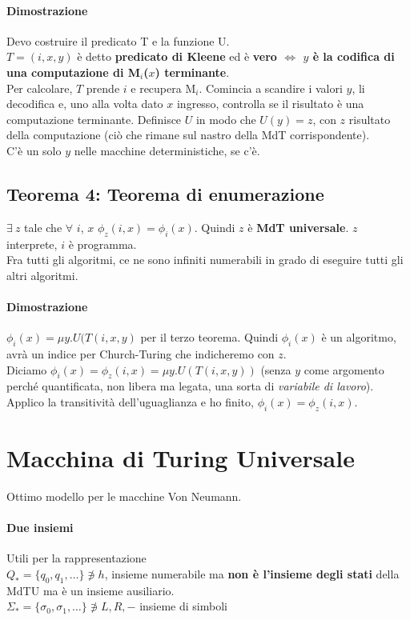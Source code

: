 \documentclass[10pt]{book}
\begin{document}
\paragraph{Dimostrazione} Devo costruire il predicato T e la funzione U.\\
$T = (i, x, y)$ è detto \textbf{predicato di Kleene} ed è \textbf{vero $\Leftrightarrow$ $y$ è la codifica di una computazione di M$_i$($x$) terminante}.\\
Per calcolare, $T$ prende $i$ e recupera M$_i$. Comincia a scandire i valori $y$, li decodifica e, uno alla volta dato $x$ ingresso, controlla se il risultato è una computazione terminante. Definisce $U$ in modo che $U(y) = z$, con $z$ risultato della computazione (ciò che rimane sul nastro della MdT corrispondente).\\
C'è un solo $y$ nelle macchine deterministiche, se c'è.
\subsection{Teorema 4: Teorema di enumerazione}
$\exists\: z$ tale che $\forall$ $i$, $x$ $\phi_z(i, x) = \phi_i(x)$. Quindi $z$ è \textbf{MdT universale}. $z$ interprete, $i$ è programma.\\
Fra tutti gli algoritmi, ce ne sono infiniti numerabili in grado di eseguire tutti gli altri algoritmi.
\paragraph{Dimostrazione} $\phi_i(x) = \mu y.U(T(i, x, y)$ per il terzo teorema. Quindi $\phi_i(x)$ è un algoritmo, avrà un indice per Church-Turing che indicheremo con $z$.\\
Diciamo $\phi_i(x) = \phi_z(i, x) = \mu y.U(T(i, x, y))$ (senza $y$ come argomento perché quantificata, non libera ma legata, una sorta di \textit{variabile di lavoro}). Applico la transitività dell'uguaglianza e ho finito, $\phi_i(x) = \phi_z(i, x)$.
\pagebreak
\section{Macchina di Turing Universale}
Ottimo modello per le macchine Von Neumann.
\paragraph{Due insiemi} Utili per la rappresentazione\\
$Q_* = \{q_0, q_1, \ldots\} \not\ni h$, insieme numerabile ma \textbf{non è l'insieme degli stati} della MdTU ma è un insieme ausiliario.\\
$\Sigma_* = \{\sigma_0, \sigma_1, \ldots\} \not\ni L, R, -$ insieme di simboli
\end{document}
